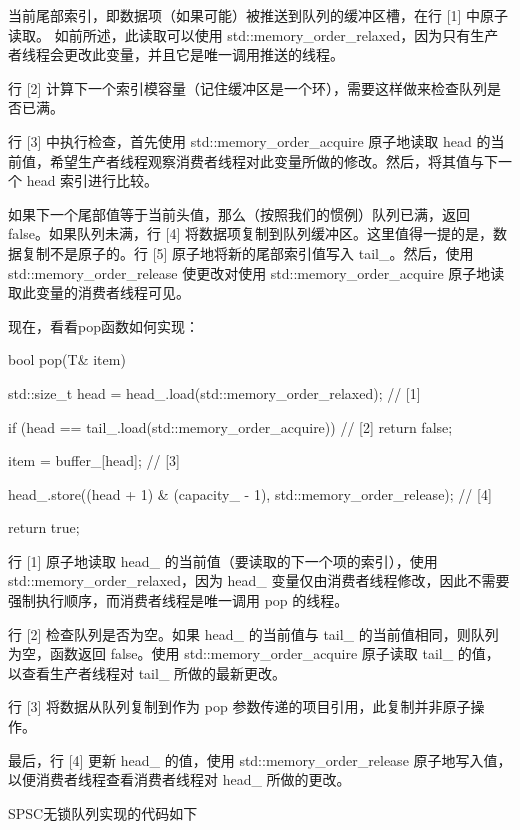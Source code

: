当前尾部索引，即数据项（如果可能）被推送到队列的缓冲区槽，在行 [1] 中原子读取。
如前所述，此读取可以使用 std::memory\_order\_relaxed，因为只有生产者线程会更改此变量，并且它是唯一调用推送的线程。

行 [2] 计算下一个索引模容量（记住缓冲区是一个环），需要这样做来检查队列是否已满。

行 [3] 中执行检查，首先使用 std::memory\_order\_acquire 原子地读取 head 的当前值，希望生产者线程观察消费者线程对此变量所做的修改。然后，将其值与下一个 head 索引进行比较。

如果下一个尾部值等于当前头值，那么（按照我们的惯例）队列已满，返回 false。如果队列未满，行 [4] 将数据项复制到队列缓冲区。这里值得一提的是，数据复制不是原子的。行 [5] 原子地将新的尾部索引值写入 tail\_。然后，使用 std::memory\_order\_release 使更改对使用 std::memory\_order\_acquire 原子地读取此变量的消费者线程可见。


现在，看看pop函数如何实现：

\begin{cpp}
bool pop(T& item) {
    std::size_t head =
        head_.load(std::memory_order_relaxed); // [1]

    if (head == tail_.load(std::memory_order_acquire)) { // [2]
        return false;
    }

    item = buffer_[head]; // [3]

    head_.store((head + 1) & (capacity_ - 1), std::memory_order_release); // [4]

    return true;
}
\end{cpp}

行 [1] 原子地读取 head\_ 的当前值（要读取的下一个项的索引），使用 std::memory\_order\_relaxed，因为 head\_ 变量仅由消费者线程修改，因此不需要强制执行顺序，而消费者线程是唯一调用 pop 的线程。

行 [2] 检查队列是否为空。如果 head\_ 的当前值与 tail\_ 的当前值相同，则队列为空，函数返回 false。使用 std::memory\_order\_acquire 原子读取 tail\_ 的值，以查看生产者线程对 tail\_ 所做的最新更改。

行 [3] 将数据从队列复制到作为 pop 参数传递的项目引用，此复制并非原子操作。

最后，行 [4] 更新 head\_ 的值，使用 std::memory\_order\_release 原子地写入值，以便消费者线程查看消费者线程对 head\_ 所做的更改。

SPSC无锁队列实现的代码如下


